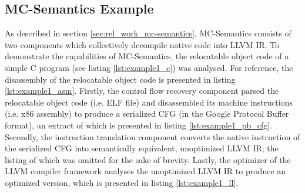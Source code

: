 
\subsection{MC-Semantics Example}
\label{app:mc-semantics_example}

As described in section \ref{sec:rel_work_mc-semantics}, MC-Semantics consists of two components which collectively decompile native code into LLVM IR. To demonstrate the capabilities of MC-Semantics, the relocatable object code of a simple C program (see listing \ref{lst:example1_c}) was analysed. For reference, the disassembly of the relocatable object code is presented in listing \ref{lst:example1_asm}. Firstly, the control flow recovery component parsed the relocatable object code (i.e. ELF file) and disassembled its machine instructions (i.e. x86 assembly) to produce a serialized CFG (in the Google Protocol Buffer format), an extract of which is presented in listing \ref{lst:example1_pb_cfg}. Secondly, the instruction translation component converts the native instruction of the serialized CFG into semantically equivalent, unoptimized LLVM IR; the listing of which was omitted for the sake of brevity. Lastly, the optimizer of the LLVM compiler framework analyses the unoptimized LLVM IR to produce an optimized version, which is presented in listing \ref{lst:example1_ll}.






